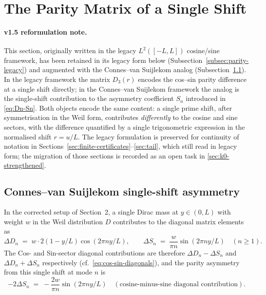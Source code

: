 \documentclass[11pt,a4paper]{article}
\theoremstyle{remark}
\theoremstyle{plain}
\begin{document}
\section{The Parity Matrix of a Single Shift}
\label{sec:parity-matrix}

\paragraph{v1.5 reformulation note.}  This section, originally written
in the legacy $L^2([-L,L])$ cosine/sine framework, has been retained
in its legacy form below (Subsection~\ref{subsec:parity-legacy}) and
augmented with the Connes--van Suijlekom analog
(Subsection~\ref{subsec:parity-cvs}).  In the legacy framework the
matrix $D_3(r)$ encodes the cos--sin parity difference at a single
shift directly; in the Connes--van Suijlekom framework the analog is
the single-shift contribution to the asymmetry coefficient $S_n$
introduced in \eqref{eq:Dn-Sn}.  Both objects encode the same
content: a single prime shift, after symmetrisation in the Weil
form, contributes \emph{differently} to the cosine and sine
sectors, with the difference quantified by a single trigonometric
expression in the normalised shift $r=u/L$.  The legacy formulation
is preserved for continuity of notation in
Sections~\ref{sec:finite-certificates}--\ref{sec:tail}, which still
read in legacy form; the migration of those sections is recorded as
an open task in \cref{sec:k0-strengthened}.

\subsection{Connes--van Suijlekom single-shift asymmetry}
\label{subsec:parity-cvs}

In the corrected setup of Section~2, a single Dirac mass at $y\in(0,L)$
with weight $w$ in the Weil distribution $D$ contributes to the
diagonal matrix elements as
\[
  \Delta D_n \;=\; w\cdot 2(1-y/L)\cos(2\pi n y/L),
  \qquad
  \Delta S_n \;=\; \frac{w}{\pi n}\sin(2\pi n y/L)
  \quad (n\geq 1).
\]
The Cos- and Sin-sector diagonal contributions are therefore
$\Delta D_n - \Delta S_n$ and $\Delta D_n + \Delta S_n$ respectively
(cf.~\eqref{eq:cos-sin-diagonals}), and the parity asymmetry from this
single shift at mode $n$ is
\begin{equation}
\label{eq:single-shift-asymmetry}
  -2\Delta S_n \;=\; -\frac{2w}{\pi n}\sin(2\pi n y/L)
  \quad
  (\text{cosine-minus-sine diagonal contribution}).
\end{equation}
\end{document}
